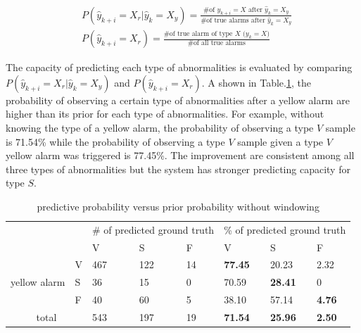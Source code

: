 \begin{align}
\nonumber 
&P(\hat{y}_{k+i}=X_r|\hat{y}_{k}=X_y)=\frac{\text{\# of $y_{k+i}=X$ after $\hat{y}_k=X_y$}}{\text{\# of true alarms after $\hat{y}_k=X_y$}} \\
&P(\hat{y}_{k+i}=X_r)=\frac{\text{\# of true alarm of type $X$ ($y_{k}=X$)}}{\text{\# of all true alarms}} 
\end{align}

The capacity of predicting each type of abnormalities is evaluated by comparing $P(\hat{y}_{k+i}=X_r|\hat{y}_{k}=X_y)$ and $P(\hat{y}_{k+i}=X_r)$. A shown in Table.\ref{table:pred}, the probability of observing a certain type of abnormalities after a yellow alarm are higher than its prior for each type of abnormalities. For example, without knowing the type of a yellow alarm, the probability of observing a type $V$ sample is 71.54\% while the probability of observing a type $V$ sample given a type $V$ yellow alarm was triggered is 77.45\%. The improvement are consistent among all three types of abnormalities but the system has stronger predicting capacity for type $S$. 

\begin{table}[t]
\centering
\caption{predictive probability versus prior probability without windowing}
\label{table:pred}
\begin{tabular}{|c|l|l|l|l||l|l|l|}
\hline
\multicolumn{2}{|l|}{\multirow{2}{*}{}} & \multicolumn{3}{l|}{\# of predicted ground truth} & \multicolumn{3}{l|}{\% of predicted ground truth} \\ \cline{3-8} 
\multicolumn{2}{|l|}{}                  & V               & S               & F             & V               & S               & F             \\ \hline
\multirow{3}{*}{yellow alarm}    & V    & 467             & 122              & 14            & \textbf{77.45}  & 20.23           & 2.32          \\ \cline{2-8} 
                                 & S    & 36              & 15              & 0             & 70.59           & \textbf{28.41}  & 0             \\ \cline{2-8} 
                                 & F    & 40              & 60              & 5             & 38.10           & 57.14           & \textbf{4.76} \\ \hline
\multicolumn{2}{|c|}{total}             & 543             & 197             & 19            & \textbf{71.54}  & \textbf{25.96}  & \textbf{2.50} \\ \hline
\end{tabular}
\end{table}

